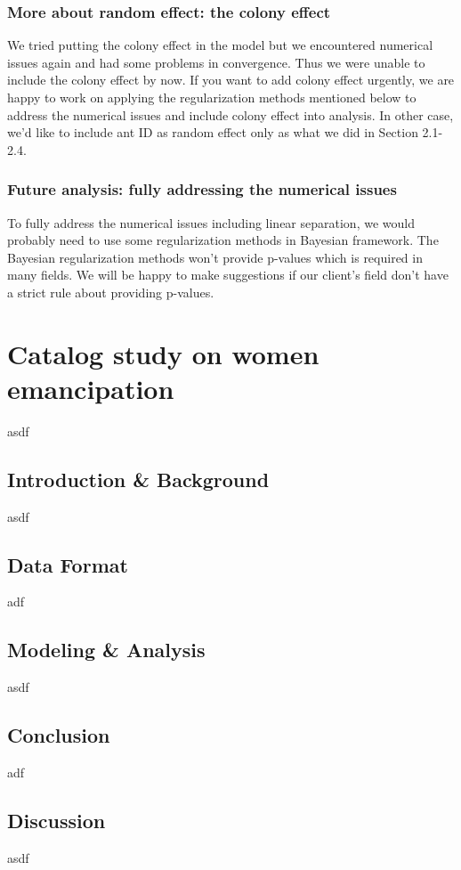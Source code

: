 \documentclass{article}
\begin{document}
	\subsubsection{More about random effect: the colony effect}
	We tried putting the colony effect in the model but we encountered numerical issues again and had some problems in convergence. Thus we were unable to include the colony effect by now. If you want to add colony effect urgently, we are happy to work on applying the regularization methods mentioned below to address the numerical issues and include colony effect into analysis. In other case, we’d like to include ant ID as random effect only as what we did in Section 2.1-2.4.
	
	\subsubsection{Future analysis: fully addressing the numerical issues}
	To fully address the numerical issues including linear separation, we would probably need to use some regularization methods in Bayesian framework. The Bayesian regularization methods won’t provide p-values which is required in many fields. We will be happy to make suggestions if our client's field don’t have a strict rule about providing p-values.
	
	\section{Catalog study on women emancipation}
	asdf
	\subsection{Introduction \& Background}
	asdf
	\subsection{Data Format}
	adf
	\subsection{Modeling \& Analysis}
	asdf
	\subsection{Conclusion}
	adf
	\subsection{Discussion}
	asdf
	
\end{document}
